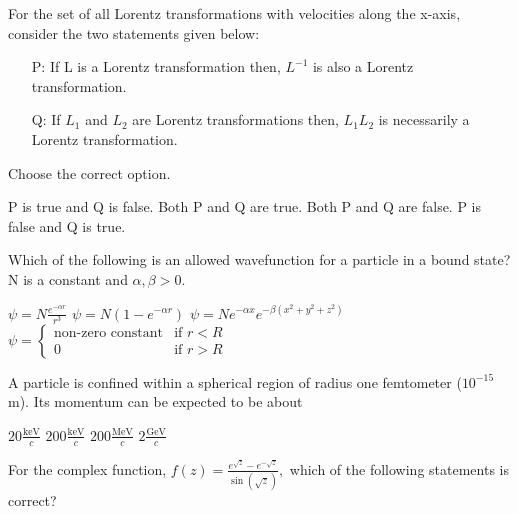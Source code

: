 \documentclass{exam}
\begin{document}
\begin{questions}
\question For the set of all Lorentz transformations with velocities along the x-axis, consider the two statements given below:
	\begin{itemize}
		\item[P:] If L is a Lorentz transformation then, $L^{-1}$ is also a Lorentz transformation.
		\item[Q:] If $L_1$ and $L_2$ are Lorentz transformations then, $L_1L_2$ is necessarily a Lorentz transformation.
	\end{itemize}
	Choose the correct option.\hfill{}

\begin{choices}
\begin{multicols}{2}
	\choice P is true and Q is false. \choice Both P and Q are true.
	\choice Both P and Q are false. \choice P is false and Q is true.
	\end{multicols}
\end{choices}

\question Which of the following is an allowed wavefunction for a particle in a bound state? N is a constant and $\alpha, \beta > 0$.\hfill{}

\begin{choices}
	\begin{multicols}{2}
	 \choice $\psi=N\frac{e^{-\alpha r}}{r^{3}}$
	\choice $\psi=N(1-e^{-\alpha r})$
	\choice $\psi=Ne^{-\alpha x}e^{-\beta(x^{2}+y^{2}+z^{2})}$
	\choice $\psi=\begin{cases} \text{non-zero constant} & \text{if } r<R \\ 0 & \text{if } r>R \end{cases}$
	\end{multicols}
\end{choices}

\question A particle is confined within a spherical region of radius one femtometer ($10^{-15}$m). Its momentum can be expected to be about\hfill{}

\begin{oneparchoices}
	\choice $20 \frac{\text{keV}}{c}$ \choice $200 \frac{\text{keV}}{c}$ \choice $200 \frac{\text{MeV}}{c}$ \choice $2 \frac{\text{GeV}}{c}$
\end{oneparchoices}


\question For the complex function, $f(z)=\frac{e^{\sqrt{z}}-e^{-\sqrt{z}}}{\sin(\sqrt{z})},$ which of the following statements is correct?\hfill{}


\end{questions}
\end{document}
